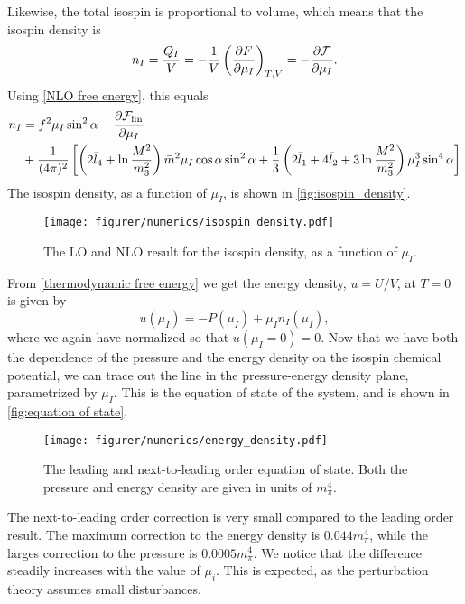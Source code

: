 Likewise, the total isospin is proportional to volume, which means that the isospin density is
\begin{equation}
    n_I = \frac{Q_I}{V} = - \frac{1}{V} \left(\diffp{F}{\mu_I}\right)_{T, V}
    = - \diffp{\Ef}{\mu_I}.
\end{equation}
Using \cref{NLO free energy}, this equals
\begin{align}
    \nonumber
    n_I & = 
    f^2 \mu_I \sin^2 \alpha
    - \diffp{\Ef_\mathrm{fin}}{\mu_I} \\
    & + \frac{1}{(4 \pi)^2}
    \left[
            \left(2\bar l_4+\ln\frac{M^2}{m_3^2}\right)\bar m^2 \mu_I \cos\alpha \sin^2 \alpha
            +\frac{1}{3}\left(2\bar l_1 + 4 \bar l_2 + 3\ln\frac{M^2}{m_3^2}\right)\mu_I^3 \sin^4 \alpha
    \right]
\end{align}
The isospin density, as a function of $\mu_I$, is shown in \autoref{fig:isospin_density}.
\begin{figure}[h]
    \centering
    \vspace{-0.2cm}
    \texttt{[image: figurer/numerics/isospin\_density.pdf]}
    \caption{The LO and NLO result for the isospin density, as a function of $\mu_I$.}
    \label{fig:isospin_density}
\end{figure}

From \cref{thermodynamic free energy} we get the energy density, $u = U/V$, at $T = 0$ is given by
\begin{equation}
    u(\mu_I) = -P(\mu_I) + \mu_I n_I(\mu_I),
\end{equation}
where we again have normalized so that $u(\mu_I = 0) = 0$.
Now that we have both the dependence of the pressure and the energy density on the isospin chemical potential, we can trace out the line in the pressure-energy density plane, parametrized by $\mu_I$.
This is the equation of state of the system, and is shown in \autoref{fig:equation of state}.

\begin{figure}[h]
    \centering
    \vspace{-0.2cm}
    \texttt{[image: figurer/numerics/energy\_density.pdf]}
    \caption{The leading and next-to-leading order equation of state. Both the pressure and energy density are given in units of $m_\pi^4$.}
    \label{fig:equation of state}
\end{figure}

The next-to-leading order correction is very small compared to the leading order result.
The maximum correction to the energy density is $0.044m_\pi^4$, while the larges correction to the pressure is $0.0005 m_\pi^4$.
We notice that the difference steadily increases with the value of $\mu_i$.
This is expected, as the perturbation theory assumes small disturbances.

